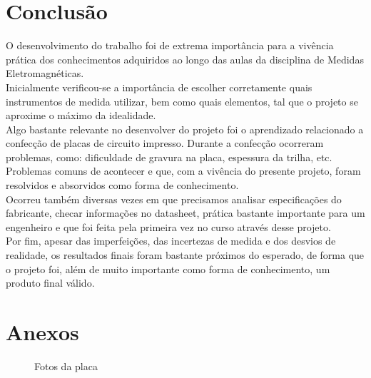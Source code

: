 \documentclass[14pt, oneside]{book}
\newcommand\tab[1][1cm]{\hspace*{#1}}
\theoremstyle{definition}
\begin{document}
        \chapter{Conclusão}
            \tab O desenvolvimento do trabalho foi de extrema importância para a vivência prática dos conhecimentos adquiridos ao longo das aulas da disciplina de Medidas Eletromagnéticas. \\
            \tab Inicialmente verificou-se a importância de escolher corretamente quais instrumentos de medida utilizar, bem como quais elementos, tal que o projeto se aproxime o máximo da idealidade. \\
            \tab Algo bastante relevante no desenvolver do projeto foi o aprendizado relacionado a confecção de placas de circuito impresso. Durante a confecção ocorreram problemas, como: dificuldade de gravura na placa, espessura da trilha, etc. Problemas comuns de acontecer e que, com a vivência do presente projeto, foram resolvidos e absorvidos como forma de conhecimento. \\
            \tab Ocorreu também diversas vezes em que precisamos analisar especificações do fabricante, checar informações no datasheet, prática bastante importante para um engenheiro e que foi feita pela primeira vez no curso através desse projeto. \\
            \tab Por fim, apesar das imperfeições, das incertezas de medida e dos desvios de realidade, os resultados finais foram bastante próximos do esperado, de forma que o projeto foi, além de muito importante como forma de conhecimento, um produto final válido.
            
        \chapter{Anexos}
        
            \begin{figure}[H]
                \centering
                \qquad
                \caption{Fotos da placa}%
                \label{fig:example}%
            \end{figure}
        
                
                
                
\end{document}
